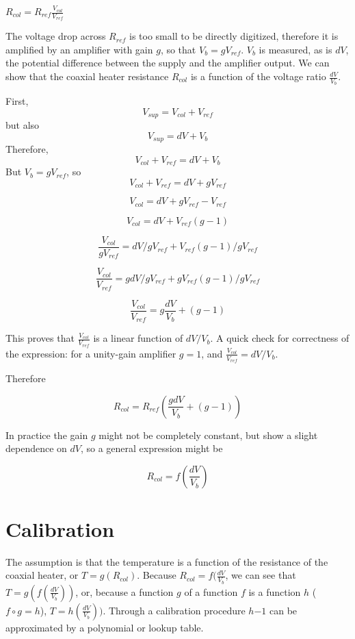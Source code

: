 \(R_{col} = R_{ref}\frac{V_{col}}{V_{ref}}\)

The voltage drop across $R_{ref}$ is too small to be directly digitized,
therefore it is amplified by an amplifier with gain $g$, so that $V_b =
gV_{ref}$. $V_b$ is measured, as is $dV$, the potential difference between the
supply and the amplifier output. We can show that the coaxial heater resistance
\(R_{col}\) is a function of the voltage ratio \(\frac{dV}{V_b}\).

First, 
\[ V_{sup} = V_{col} + V_{ref} \] 
but also
\[ V_{sup} = dV + V_b \]
Therefore,
\[ V_{col} + V_{ref} = dV + V_b \]
But \(V_{b} = g V_{ref}\), so
\[ V_{col} + V_{ref} = dV + gV_{ref} \]

\[ V_{col} = dV + gV_{ref} - V_{ref} \]

\[ V_{col} = dV + V_{ref}(g - 1) \]

\[ \frac{\displaystyle V_{col}}{\displaystyle gV_{ref}} = dV/gV_{ref} + V_{ref}(g-1)/gV_{ref} \]

\[\frac{\displaystyle V_{col}}{\displaystyle V_{ref}} = gdV/gV_{ref} + gV_{ref}(g-1)/gV_{ref} \]

\[\frac{\displaystyle V_{col}}{\displaystyle V_{ref}} = g\frac{dV}{V_b} + (g-1) \]

This proves that \( \frac{\displaystyle V_{col}}{\displaystyle V_{ref}} \) is a
linear function of $dV/V_b$. A quick check for correctness of the expression:
for a unity-gain amplifier $g = 1$, and $\frac{\displaystyle
V_{col}}{\displaystyle V_{ref}} = dV/V_b$.

Therefore 

\[ R_{col} = R_{ref} \left(\frac{g{dV}}{V_b} + (g-1) \right) \]

In practice the gain \(g\) might not be completely constant, but show a slight
dependence on \(dV\), so a general expression might be

\[ R_{col} = f\left(\frac{dV}{V_b} \right) \]


\section{Calibration}

The assumption is that the temperature is a function of the resistance of the
coaxial heater, or \( T = g(R_{col}) \). Because \( R_{col}=f(\frac{dV}{V_b} \),
we can see that \( T = g(f(\frac{dV}{V_b})) \), or, because a function \(g\) of
a function \(f\) is a function \(h\) (\(f \circ g = h \)), \( T =
h(\frac{dV}{V_b})) \).  Through a calibration procedure \(h{-1}\) can be
approximated by a polynomial or lookup table.

